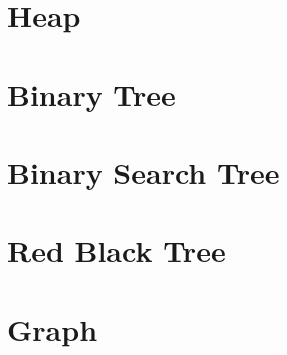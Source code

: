 \chapter{ Heap }

\chapter{ Binary Tree }

\chapter{ Binary Search Tree }

\chapter{ Red Black Tree }

\chapter{ Graph }

